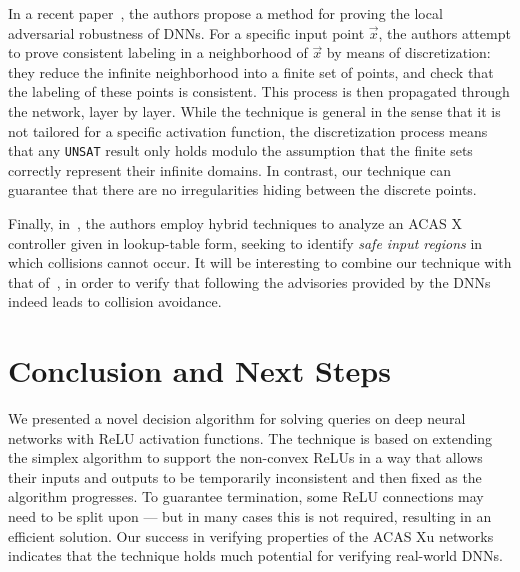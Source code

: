\documentclass[a4paper]{llncs}
\newcommand{\unsat}{\texttt{UNSAT}}
\begin{document}
In a recent paper~\cite{HuKwWaWu16}, the authors propose a method for proving
the local adversarial robustness of DNNs. 
For a specific
input point $\vec{x}$, the authors attempt to prove consistent labeling in a
neighborhood of $\vec{x}$ by means of discretization: they reduce
the infinite neighborhood into a finite set of points, and check that
the labeling of these points is consistent. This process is then propagated through the
network, layer by layer. While the technique is general in the sense
that it is not tailored for a specific activation function, the
discretization process means that any \unsat{} result only holds modulo
the assumption that the finite sets correctly represent their infinite domains.
In contrast, our technique can guarantee that there are no 
 irregularities hiding between the discrete points. 

Finally, in~\cite{JaGhKoGaScZaPl15}, the authors
 employ hybrid techniques to analyze an ACAS X controller given in
 lookup-table form,
 seeking to identify \emph{safe input regions} in which collisions
 cannot occur.
It will be interesting to combine our technique with
that of~\cite{JaGhKoGaScZaPl15}, in order to verify that following the
advisories provided by the DNNs indeed leads to collision avoidance.

\section{Conclusion and Next Steps}
\label{sec:conclusion}

We presented a novel decision algorithm for solving queries on
deep neural networks with ReLU activation functions. The
technique is based on extending the simplex algorithm to support
the non-convex ReLUs in a way that allows their inputs and outputs to be
temporarily inconsistent and
then fixed as the algorithm progresses.  To guarantee
termination, some ReLU connections may need to be split upon --- but in many
cases this is not required, resulting in an efficient solution. Our
success in verifying properties of the ACAS Xu networks
indicates that the technique holds much potential for verifying
real-world DNNs.
\end{document}

